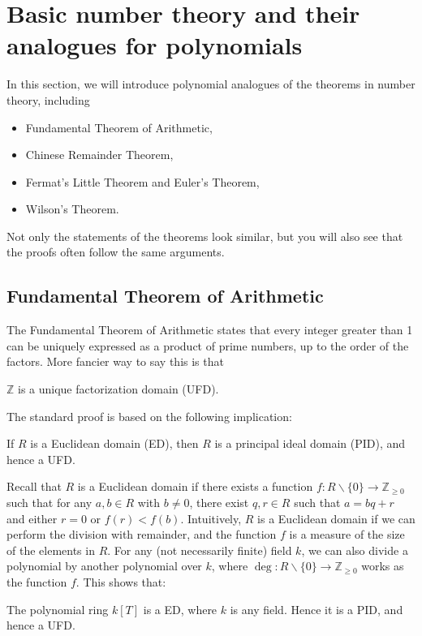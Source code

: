 \section{Basic number theory and their analogues for polynomials}
\label{sec:basicnt}

In this section, we will introduce polynomial analogues of the theorems in number theory, including
\begin{itemize}
    \item Fundamental Theorem of Arithmetic,
    \item Chinese Remainder Theorem,
    \item Fermat's Little Theorem and Euler's Theorem,
    \item Wilson's Theorem.
\end{itemize}
Not only the statements of the theorems look similar, but you will also see that the proofs often follow the same arguments.


\subsection{Fundamental Theorem of Arithmetic}
\label{subsec:basicnt_fta}

The Fundamental Theorem of Arithmetic states that every integer greater than 1 can be uniquely expressed as a product of prime numbers, up to the order of the factors.
More fancier way to say this is that

\begin{theorem}
    \label{thm:fta}
    $\mathbb{Z}$ is a unique factorization domain (UFD).
\end{theorem}
The standard proof is based on the following implication:
\begin{theorem}
    If $R$ is a Euclidean domain (ED), then $R$ is a principal ideal domain (PID), and hence a UFD.
\end{theorem}
Recall that $R$ is a Euclidean domain if there exists a function $f : R \backslash \{0\} \to \mathbb{Z}_{\geq 0}$ such that for any $a, b \in R$ with $b \neq 0$, there exist $q, r \in R$ such that $a = bq + r$ and either $r = 0$ or $f(r) < f(b)$.
Intuitively, $R$ is a Euclidean domain if we can perform the division with remainder, and the function $f$ is a measure of the size of the elements in $R$.
For any (not necessarily finite) field $k$, we can also divide a polynomial by another polynomial over $k$, where $\deg : R \backslash \{0\} \to \mathbb{Z}_{\geq 0}$ works as the function $f$.
This shows that:
\begin{theorem}
    \label{thm:polynomial_fta}
    The polynomial ring $k[T]$ is a ED, where $k$ is any field.
    Hence it is a PID, and hence a UFD.
\end{theorem}

